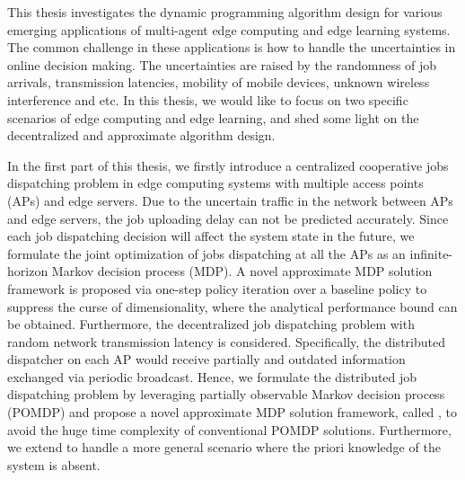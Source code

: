 
This thesis investigates the dynamic programming algorithm design for various emerging applications of multi-agent edge computing and edge learning systems.
The common challenge in these applications is how to handle the uncertainties in online decision making.
The uncertainties are raised by the randomness of job arrivals, transmission latencies, mobility of mobile devices, unknown wireless interference and etc.
In this thesis, we would like to focus on two specific scenarios of edge computing and edge learning, and shed some light on the decentralized and approximate algorithm design.

In the first part of this thesis, we firstly introduce a centralized cooperative jobs dispatching problem in edge computing systems with multiple access points (APs) and edge servers.
Due to the uncertain traffic in the network between APs and edge servers, the job uploading delay can not be predicted accurately.
Since each job dispatching decision will affect the system state in the future, we formulate the joint optimization of jobs dispatching at all the APs as an infinite-horizon Markov decision process (MDP).
A novel approximate MDP solution framework is proposed via one-step policy iteration over a baseline policy to suppress the curse of dimensionality, where the analytical performance bound can be obtained.
Furthermore, the decentralized job dispatching problem with random network transmission latency is considered.
Specifically, the distributed dispatcher on each AP would receive partially and outdated information exchanged via periodic broadcast.
Hence, we formulate the distributed job dispatching problem by leveraging partially observable Markov decision process (POMDP) and propose a novel approximate MDP solution framework, called {\Dalgname}, to avoid the huge time complexity of conventional POMDP solutions.
Furthermore, we extend {\Dalgname} to handle a more general scenario where the priori knowledge of the system is absent.

